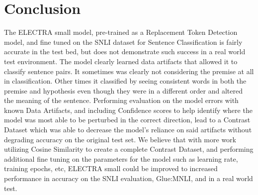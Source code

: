\documentclass[11pt]{article}
\begin{document}
\section{Conclusion}
The ELECTRA small model, pre-trained as a Replacement Token Detection model, and fine tuned on the SNLI dataset for Sentence Classification is fairly accurate in the test bed, but does not demonstrate such success in a real world test environment. The model clearly learned data artifacts that allowed it to classify sentence pairs. It sometimes was clearly not considering the premise at all in classification. Other times it classified by seeing consistent words in both the premise and hypothesis even though they were in a different order and altered the meaning of the sentence.
Performing evaluation on the model errors with known Data Artifacts, and including Confidence scores to help identify where the model was most able to be perturbed in the correct direction, lead to a Contrast Dataset which was able to decrease the model's reliance on said artifacts without degrading accuracy on the original test set.
We believe that with more work utilizing Cosine Similarity to create a complete Contrast Dataset, and performing additional fine tuning on the parameters for the model such as learning rate, training epochs, etc, ELECTRA small could be improved to increased performance in accuracy on the SNLI evaluation, Glue:MNLI, and in a real world test.


\end{document}
